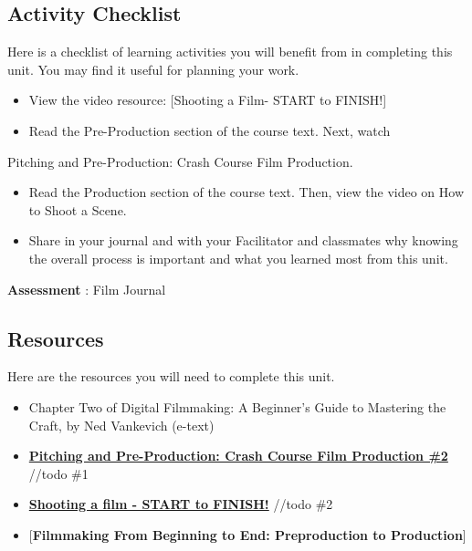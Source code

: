 \documentclass[
]{book}
\providecommand{\tightlist}{%
  \setlength{\itemsep}{0pt}\setlength{\parskip}{0pt}}
\begin{document}
\hypertarget{activity-checklist-1}{%
\subsection*{Activity Checklist}\label{activity-checklist-1}}

\begin{reflect}
Here is a checklist of learning activities you will benefit from in completing this unit. You may find it useful for planning your work.

\begin{itemize}
\tightlist
\item
  View the video resource: {[}Shooting a Film- START to FINISH!{]}
\end{itemize}

\begin{itemize}
\tightlist
\item
  Read the Pre-Production section of the course text.
  Next, watch
\end{itemize}

Pitching and Pre-Production: Crash Course Film Production.

\begin{itemize}
\item
  Read the Production section of the course text. Then, view the video on How to Shoot a Scene.
\item
  Share in your journal and with your Facilitator and classmates why knowing the overall process is important and what you learned most from this unit.
\end{itemize}

\textbf{Assessment} : Film Journal
\end{reflect}

\hypertarget{resources-1}{%
\subsection*{Resources}\label{resources-1}}

Here are the resources you will need to complete this unit.

\begin{itemize}
\item
  Chapter Two of Digital Filmmaking: A Beginner's Guide to Mastering the Craft, by Ned Vankevich (e-text)
\item
  \href{https://www.youtube.com/watch?v=JE53JL60ihc}{\textbf{Pitching and Pre-Production: Crash Course Film Production \#2}}
  //todo \#1
\item
  \href{https://www.youtube.com/watch?v=8NCLf9rF6IQ}{\textbf{Shooting a film - START to FINISH!}}
  //todo \#2
\item
  {[}\textbf{Filmmaking From Beginning to End: Preproduction to Production}{]}
\end{itemize}
\end{document}
